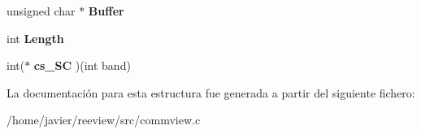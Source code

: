 \begin{DoxyCompactItemize}
\item 
\hypertarget{structcstate_abdde898cee33ccd594a6ac92aa70a95c}{
unsigned char $\ast$ {\bfseries Buffer}}
\label{structcstate_abdde898cee33ccd594a6ac92aa70a95c}

\item 
\hypertarget{structcstate_a76c9d79cfd22595ab33c6c03760f4dfb}{
int {\bfseries Length}}
\label{structcstate_a76c9d79cfd22595ab33c6c03760f4dfb}

\item 
\hypertarget{structcstate_af2373084f3139c77eddacef58192164c}{
int($\ast$ {\bfseries cs\_\-SC} )(int band)}
\label{structcstate_af2373084f3139c77eddacef58192164c}

\end{DoxyCompactItemize}


La documentación para esta estructura fue generada a partir del siguiente fichero:\begin{DoxyCompactItemize}
\item 
/home/javier/reeview/src/commview.c\end{DoxyCompactItemize}
